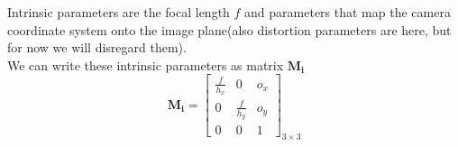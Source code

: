 Intrinsic parameters are the focal length $f$ and parameters that map the camera coordinate system onto the image plane(also distortion parameters are here, but for now we will disregard them). \\
We can write these intrinsic parameters as matrix $\pmb{M_i}$
\[
    \pmb{M_i} = 
    \begin{bmatrix}
        \frac{f}{h_x} & 0 & o_x \\
        0 & \frac{f}{h_y} & o_y \\
        0 & 0 & 1
    \end{bmatrix}_{3\times3}
\]